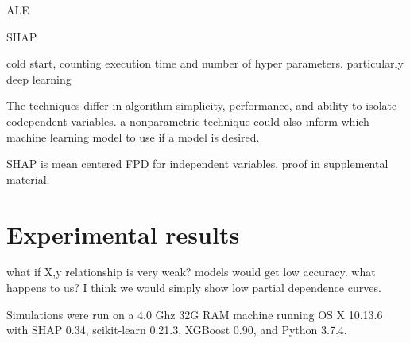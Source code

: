 \documentclass{article}
\newcommand{\cut}[1]{}
\begin{document}
ALE

SHAP

cold start, counting execution time and number of hyper parameters. particularly deep learning

The techniques differ in algorithm simplicity, performance, and ability to isolate codependent variables. a nonparametric technique could also inform which machine learning model to use if a model is desired.

SHAP is mean centered FPD for independent variables, proof in supplemental material.

\section{Experimental results}\label{sec:experiments}

what if X,y relationship is very weak? models would get low accuracy. what happens to us?  I think we would simply show low partial dependence curves.

Simulations were run on a 4.0 Ghz 32G RAM machine running OS X 10.13.6 with SHAP 0.34, scikit-learn                       0.21.3, XGBoost 0.90, and Python 3.7.4.

\cut{
flight shape (5714008, 17), 6 cats
rent shape (49352, 20), no cats
bulldozer shape (362781, 14) records, 5 cats
}
\end{document}
